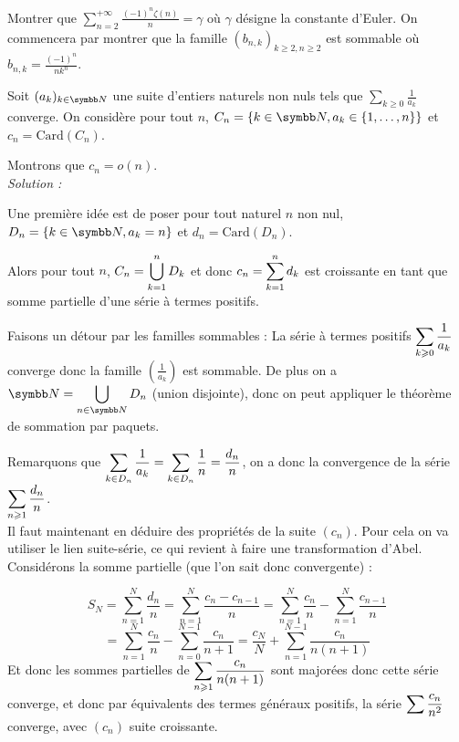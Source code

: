 \begin{exercice}
    Montrer que $\displaystyle\sum_{n=2}^{+\infty}\frac{(-1)^{n}\zeta(n)}{n}=\gamma$ où $\gamma$ désigne la constante d'Euler.
    On commencera par montrer que la famille $(b_{n,k})_{k\geqslant2,n\geqslant2}$ est sommable où $b_{n,k}=\frac{(-1)^{n}}{nk^{n}}$.
\end{exercice}

\begin{exercice}
    Soit $(a_{k})_{k\in \N}$ une suite d'entiers naturels non nuls tels que $\sum_{k\ge0}\frac{1}{a_{k}}$ converge.
    On considère pour tout $n$, $C_{n} = \{k\in\N, a_{k}\in\{1,\dots,n\}\}$ et $c_{n}=\text{Card}(C_{n})$.

    Montrons que $c_{n}=o(n)$. \\

\textit{Solution :}

    Une première idée est de poser pour tout naturel $n$ non nul, $D_{n}=\{k\in\N, a_{k}=n\}$ et $d_{n}=\text{Card}(D_{n})$.
    
    Alors pour tout $n$, $\displaystyle C_{n}=\bigcup_{k=1}^{n}D_{k}$ 
    et donc $\displaystyle c_{n}=\sum_{k=1}^{n}d_{k}$ est croissante en tant que somme partielle d'une série à termes positifs.

    Faisons un détour par les familles sommables :
    La série à termes positifs $\displaystyle \sum_{k\geqslant0}\frac{1}{a_{k}}$ converge donc la famille $\left(\frac{1}{a_{k}}\right)$ est sommable.
    De plus on a $\ds \N=\bigcup_{n\in \N} D_{n}$ (union disjointe), donc on peut appliquer le théorème de sommation par paquets.

    Remarquons que $\displaystyle \sum_{k\in D_{n}} \frac{1}{a_{k}}=\sum_{k\in D_{n}} \frac{1}{n}=\frac{d_{n}}{n}$, 
    on a donc la convergence de la série $\displaystyle \sum_{n\geqslant1}\frac{d_{n}}{n}$. \\

    Il faut maintenant en déduire des propriétés de la suite $(c_{n})$.
    Pour cela on va utiliser le lien suite-série, ce qui revient à faire une transformation d'Abel.
    Considérons la somme partielle (que l'on sait donc convergente) :

    \[S_{N}=\sum_{n=1}^{N}\frac{d_{n}}{n}=\sum_{n=1}^{N}\frac{c_{n}-c_{n-1}}{n}=\sum_{n=1}^{N}\frac{c_{n}}{n}-\sum_{n=1}^{N}\frac{c_{n-1}}{n}\]
    \[=\sum_{n=1}^{N}\frac{c_{n}}{n}-\sum_{n=0}^{N-1}\frac{c_{n}}{n+1}=\frac{c_{N}}{N}+\sum_{n=1}^{N-1}\frac{c_{n}}{n(n+1)}\]
    Et donc les sommes partielles de $\displaystyle \sum_{n\geqslant1}\frac{c_{n}}{n(n+1)}$ sont majorées donc cette série converge, 
    et donc par équivalents des termes généraux positifs, la série $\displaystyle \sum \frac{c_{n}}{n^{2}}$ converge, avec $(c_{n})$ suite croissante.


\end{exercice}
